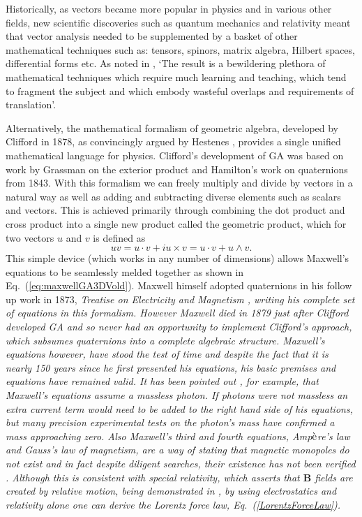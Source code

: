 \documentclass[12pt,aps,prb,preprint]{revtex4}   %
\newcommand{\be}{\begin{equation}}
\newcommand{\ee}{\end{equation}}
\newcommand{\iGA}{{i}}
\begin{document}
Historically, as vectors became more popular in physics and in various other fields, new scientific discoveries such as quantum mechanics and relativity meant that vector analysis needed to be supplemented by a basket of other mathematical techniques such as: tensors, spinors, matrix algebra, Hilbert spaces,
differential forms etc. As noted in \cite{Simons:2009}, `The result is a bewildering plethora of mathematical techniques which require much learning and teaching, which tend to fragment the subject and which embody wasteful overlaps and requirements of translation'.

Alternatively, the mathematical formalism of geometric algebra, developed by Clifford in 1878, as convincingly argued by Hestenes \cite{GA2},  provides a single unified mathematical language for physics.  Clifford's development of GA was based on work by Grassman on the exterior product and Hamilton's work on quaternions from 1843.  With this formalism we can freely multiply and divide by vectors in a natural way as well as adding and subtracting diverse elements such as scalars and vectors.  This is achieved primarily through combining the dot product and cross product into a single new product called the geometric product, which for two vectors $ u $ and $ v $ is defined as
\be \label{geometricProductuv}
u v = u \cdot v + \iGA u \times v = u \cdot v + u \wedge v.
\ee
This simple device (which works in any number of dimensions) allows Maxwell's equations to be seamlessly melded together as shown in Eq.~(\ref{eq:maxwellGA3DVold}). Maxwell himself adopted quaternions in his follow up work in 1873, \itshape{Treatise on Electricity and Magnetism} \upshape \cite{Maxwell:1873}, writing his complete set of equations in this formalism.  However Maxwell died in 1879 just after Clifford developed GA and so never had an opportunity to implement Clifford's approach, which subsumes quaternions into a complete algebraic structure. 
Maxwell's equations however, have stood the test of time and despite the fact that it is nearly 150 years since he first presented his equations, his basic premises and equations have remained valid.
It has been pointed out \cite{Tu2005}, for example, that Maxwell's equations assume a massless photon.  If photons were not massless an extra current term would need to be added to the right hand side of his equations, but many precision experimental tests on the photon's mass have confirmed a mass approaching zero. Also Maxwell's third and fourth equations, Amp$\grave{\rm{e}}$re's law and Gauss's law of magnetism, are a way of stating that magnetic monopoles do not exist and in fact despite diligent searches, their existence has not been verified \cite{Griffiths:1999}. Although this is consistent with special relativity, which asserts that $ \textbf{B} $ fields are created by relative motion, being demonstrated in \cite{Lorraine1988}, by using electrostatics and relativity alone one can derive the Lorentz force law, Eq.~(\ref{LorentzForceLaw}). 
\end{document}
